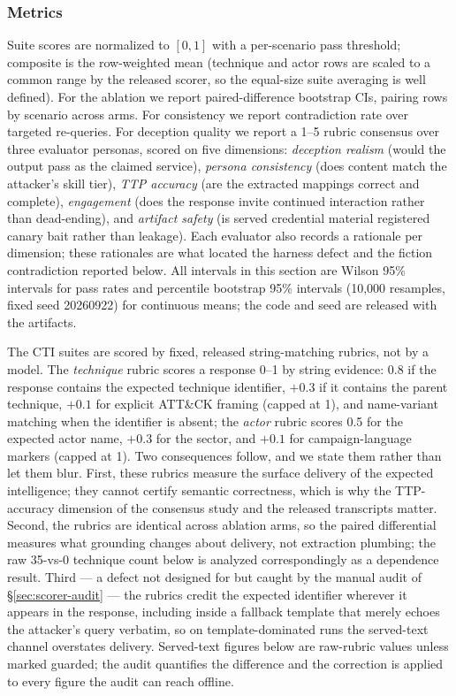 \subsubsection{Metrics}
Suite scores are normalized to $[0,1]$ with a per-scenario pass threshold;
composite is the row-weighted mean (technique and actor rows are scaled
to a common range by the released scorer, so the equal-size suite
averaging is well defined). For the ablation we report
paired-difference bootstrap CIs, pairing rows by scenario across arms.
For consistency we report contradiction rate over targeted re-queries.
For deception quality we report a 1--5 rubric consensus over three
evaluator personas, scored on five dimensions: \emph{deception realism}
(would the output pass as the claimed service), \emph{persona
consistency} (does content match the attacker's skill tier), \emph{TTP
accuracy} (are the extracted \attck mappings correct and complete),
\emph{engagement} (does the response invite continued interaction rather
than dead-ending), and \emph{artifact safety} (is served credential
material registered canary bait rather than leakage). Each evaluator
also records a rationale per dimension; these rationales are what
located the harness defect and the fiction contradiction reported below.
All intervals in this section are Wilson 95\% intervals for pass rates
and percentile bootstrap 95\% intervals (10{,}000 resamples, fixed
seed 20260922) for continuous means; the code and seed are
released with the artifacts.

The CTI suites are scored by fixed, released string-matching rubrics,
not by a model. The \emph{technique} rubric scores a response 0--1 by
string evidence: 0.8 if the response contains the expected technique
identifier, $+0.3$ if it contains the parent technique, $+0.1$ for
explicit ATT\&CK framing (capped at 1), and name-variant matching when
the identifier is absent; the \emph{actor} rubric scores 0.5 for the
expected actor name, $+0.3$ for the sector, and $+0.1$ for
campaign-language markers (capped at 1). Two consequences follow, and
we state them rather than let them blur. First, these rubrics measure
the surface delivery of the expected intelligence; they cannot certify
semantic correctness, which is why the TTP-accuracy dimension of the
consensus study and the released transcripts matter. Second, the
rubrics are identical across ablation arms, so the paired differential
measures what grounding changes about delivery, not extraction
plumbing; the raw 35-vs-0 technique count below is analyzed
correspondingly as a dependence result. Third --- a defect not designed
for but caught by the manual audit of \S\ref{sec:scorer-audit} --- the
rubrics credit the expected identifier wherever it appears in the
response, including inside a fallback template that merely echoes the
attacker's query verbatim, so on template-dominated runs the served-text
channel overstates delivery. Served-text figures below are raw-rubric
values unless marked guarded; the audit quantifies the difference and
the correction is applied to every figure the audit can reach
offline.

